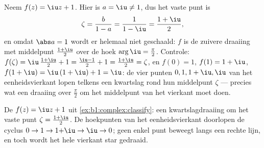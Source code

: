 \begin{example}\label{ex:b1:complex:classify}
Neem $f(z) = \iu z + 1$. Hier is $a = \iu \neq 1$, dus het vaste punt is
\[
\zeta = \frac{b}{1 - a} = \frac1{1 - \iu}
= \frac{1 + \iu}{2},
\]
en omdat $\abs a = 1$ wordt er helemaal niet geschaald: $f$ is de zuivere
draaiing met middelpunt $\frac{1+\iu}2$ over de hoek $\arg \iu =
\frac\pi2$. Controle: $f(\zeta) = \iu\,\frac{1+\iu}2 + 1 = \frac{\iu -
1}2 + 1 = \frac{1 + \iu}2 = \zeta$, en $f(0) = 1$, $f(1) = 1 + \iu$, $f(1
+ \iu) = \iu\,(1 + \iu) + 1 = \iu$: de vier punten $0, 1, 1+\iu, \iu$ van
het eenheidsvierkant lopen telkens een kwartslag rond hun middelpunt
$\zeta$ --- precies wat een draaiing over $\frac\pi2$ om het middelpunt
van het vierkant moet doen.
\end{example}

\begin{omfigure}

{\small De  $f(z) = \iu z + 1$ uit
\cref{ex:b1:complex:classify}: een kwartslagdraaiing om het vaste punt
$\zeta = \frac{1+\iu}2$. De hoekpunten van het eenheidsvierkant
doorlopen de cyclus $0 \to 1 \to 1{+}\iu \to \iu \to 0$; geen enkel
punt beweegt langs een rechte lijn, en toch wordt het hele vierkant
star gedraaid.}
\end{omfigure}

